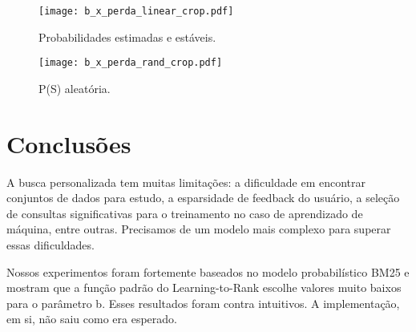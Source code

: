 \documentclass{svproc}
\begin{document}
\begin{figure}[ht]
  \caption{Probabilidades estimadas e estáveis.}
  \label{graf:linear}
  \centering
  \texttt{[image: b\_x\_perda\_linear\_crop.pdf]}
\end{figure}

\begin{figure}[ht]
  \caption{P(S) aleatória.}
  \label{graf:rand}
  \centering
  \texttt{[image: b\_x\_perda\_rand\_crop.pdf]}
\end{figure}

\pagebreak


\section{Conclusões}
A busca personalizada tem muitas limitações: a dificuldade em encontrar conjuntos de dados para estudo, a
esparsidade de feedback do usuário, a seleção de consultas significativas para o treinamento no caso de aprendizado
de máquina, entre outras. Precisamos de um modelo mais complexo para superar essas dificuldades.

Nossos experimentos foram fortemente baseados no modelo probabilístico BM25 e mostram que a função padrão do Learning-to-Rank
escolhe valores muito baixos para o parâmetro b. Esses resultados foram contra intuitivos. A implementação, em si, não 
saiu como era esperado.
\end{document}
